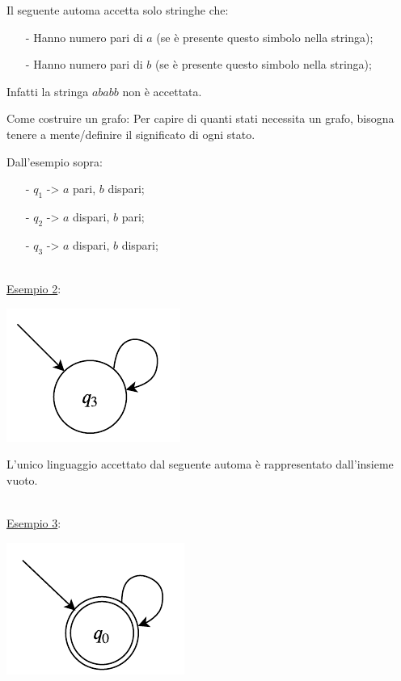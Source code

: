 \documentclass[a4paper, 10pt]{report}
\begin{document}
\noindent Il seguente automa accetta solo stringhe che:
\begin{itemize}
\item[-] Hanno numero pari di $a$ (se è presente questo simbolo nella stringa);
\item[-] Hanno numero pari di $b$ (se è presente questo simbolo nella stringa);
\end{itemize}

\noindent Infatti la stringa $ababb$ non è accettata.

\begin{tcolorbox}
Come costruire un grafo: Per capire di quanti stati necessita un grafo, bisogna tenere a mente/definire il significato di ogni stato.

Dall'esempio sopra:
\begin{itemize}
\item[-] $q_1$ -> $a$ pari, $b$ dispari;
\item[-] $q_2$ -> $a$ dispari, $b$ pari;
\item[-] $q_3$ -> $a$ dispari, $b$ dispari;
\end{itemize}
\end{tcolorbox}

\noindent \\ \underline{Esempio 2}:\\

\begin{center}
\includegraphics[scale=1]{14ottobre04.pdf}
\end{center}

\noindent L'unico linguaggio accettato dal seguente automa è rappresentato dall'insieme vuoto.

\noindent \\ \underline{Esempio 3}:\\

\begin{center}
\includegraphics[scale=1]{14ottobre03.pdf}
\end{center}
\end{document}
